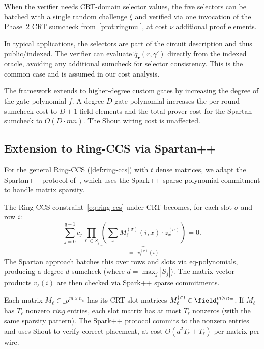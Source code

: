 When the verifier needs CRT-domain selector values, the five selectors can be batched with a single random challenge $\xi$ and verified via one invocation of the Phase~2 CRT sumcheck from~\cref{prot:ringmul}, at cost $\nu$ additional proof elements.

In typical applications, the selectors are part of the circuit description and thus public/indexed. The verifier can evaluate $\tilde{q}_\bullet(r, \gamma')$ directly from the indexed oracle, avoiding any additional sumcheck for selector consistency. This is the common case and is assumed in our cost analysis.

The framework extends to higher-degree custom gates by increasing the degree of the gate polynomial $f$. A degree-$D$ gate polynomial increases the per-round sumcheck cost to $D+1$ field elements and the total prover cost for the Spartan sumcheck to $O(D \cdot mn)$. The Shout wiring cost is unaffected.


\subsection{Extension to Ring-CCS via Spartan++}
\label{sec:ring-spartan-pp}

For the general Ring-CCS (\cref{def:ring-ccs}) with $t$ dense matrices, we adapt the Spartan++ protocol of~\cite[Section 5]{twist-and-shout}, which uses the Spark++ sparse polynomial commitment to handle matrix sparsity.

The Ring-CCS constraint~\eqref{eq:ring-ccs} under CRT becomes, for each slot $\sigma$ and row $i$:
\[
    \sum_{j=0}^{q-1} c_j \prod_{\ell \in S_j} \underbrace{\left(\sum_{x} M_\ell^{(\sigma)}(i, x) \cdot z_x^{(\sigma)}\right)}_{=:\, v_{\ell}^{(\sigma)}(i)} = 0.
\]
The Spartan approach batches this over rows and slots via eq-polynomials, producing a degree-$d$ sumcheck (where $d = \max_j |S_j|$). The matrix-vector products $v_\ell(i)$ are then checked via Spark++ sparse commitments.

Each matrix $M_\ell \in \ring_p^{m \times n_w}$ has its CRT-slot matrices $M_\ell^{(\sigma)} \in \field_p^{m \times n_w}$. If $M_\ell$ has $T_\ell$ nonzero \emph{ring} entries, each slot matrix has at most $T_\ell$ nonzeros (with the same sparsity pattern). The Spark++ protocol commits to the nonzero entries and uses Shout to verify correct placement, at cost $O(d^2 T_\ell + T_\ell)$ per matrix per wire.

